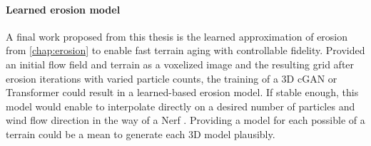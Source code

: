 
\paragraph{Learned erosion model} A final work proposed from this thesis is the learned approximation of erosion from \cref{chap:erosion} to enable fast terrain aging with controllable fidelity. Provided an initial flow field \cite{Tompson2017} and terrain as a voxelized image and the resulting grid after erosion iterations with varied particle counts, the training of a 3D cGAN \cite{Ongun2018} or Transformer \cite{Vaswani2017} could result in a learned-based erosion model. If stable enough, this model would enable to interpolate directly on a desired number of particles and wind flow direction in the way of a Nerf \cite{Mildenhall2020}. Providing a model for each possible  of a terrain could be a mean to generate each 3D model plausibly.






